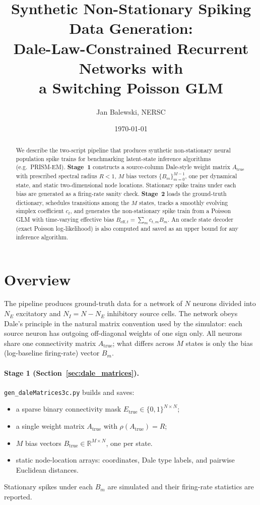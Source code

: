 \documentclass[11pt]{article}
\title{Synthetic Non-Stationary Spiking Data Generation:\\
Dale-Law-Constrained Recurrent Networks with\\
a Switching Poisson GLM}
\author{Jan Balewski, NERSC}
\date{\today}
\begin{document}
\maketitle

\begin{abstract}
We describe the two-script pipeline that produces synthetic non-stationary
neural population spike trains for benchmarking latent-state inference
algorithms (e.g.\ PRISM-EM).
\textbf{Stage~1} constructs a source-column Dale-style weight matrix
$A_{\text{true}}$ with prescribed spectral radius $R<1$, $M$ bias
vectors $\{B_m\}_{m=0}^{M-1}$, one per dynamical state, and static
two-dimensional node locations.
Stationary spike trains under each bias are generated as a
firing-rate sanity check.
\textbf{Stage~2} loads the ground-truth dictionary, schedules transitions
among the $M$ states, tracks a smoothly evolving simplex coefficient
$c_t$, and generates the non-stationary spike train from a Poisson GLM
with time-varying effective bias
$B_{\mathrm{eff},t} = \sum_m c_{t,m} B_m$.
An oracle state decoder (exact Poisson log-likelihood) is also
computed and saved as an upper bound for any inference algorithm.
\end{abstract}

\tableofcontents
\newpage

\section{Overview}
\label{sec:overview}

The pipeline produces ground-truth data for a network of $N$ neurons
divided into $N_E$ excitatory and $N_I = N - N_E$ inhibitory source cells.
The network obeys Dale's principle in the natural matrix convention used by
the simulator: each source neuron has outgoing off-diagonal weights of one
sign only.
All neurons share one connectivity matrix $A_{\text{true}}$; what
differs across $M$ states is only the bias (log-baseline firing-rate)
vector $B_m$.

\paragraph{Stage 1 (Section~\ref{sec:dale_matrices}).}
\texttt{gen\_daleMatrices3c.py} builds and saves:
\begin{itemize}
  \item a sparse binary connectivity mask $E_{\text{true}} \in
        \{0,1\}^{N \times N}$;
  \item a single weight matrix $A_{\text{true}}$ with
        $\rho(A_{\text{true}}) = R$;
  \item $M$ bias vectors $B_{\text{true}} \in \mathbb{R}^{M \times N}$,
        one per state.
  \item static node-location arrays: coordinates, Dale type labels, and
        pairwise Euclidean distances.
\end{itemize}
Stationary spikes under each $B_m$ are simulated and their
firing-rate statistics are reported.
\end{document}
